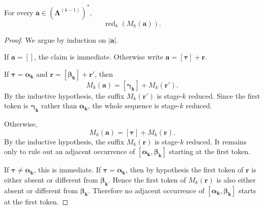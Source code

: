 \begin{lemma}
    \label{lemma:bpe-merge-produces-reduced}
    For every $\mathbf{a} \in (\boldsymbol{\Lambda}^{(k-1)})^*$,
    \[
    \operatorname{red}_k(M_k(\mathbf{a})).
    \]
\end{lemma}
\begin{proof}
    We argue by induction on $|\mathbf{a}|$.

    If $\mathbf{a} = []$, the claim is immediate.
    Otherwise write $\mathbf{a} = [\boldsymbol{\tau}] + \mathbf{r}$.

    If $\boldsymbol{\tau} = \boldsymbol{\alpha_k}$ and $\mathbf{r} = [\boldsymbol{\beta_k}] + \mathbf{r}'$,
    then
    \[
    M_k(\mathbf{a}) = [\boldsymbol{\gamma_k}] + M_k(\mathbf{r}').
    \]
    By the inductive hypothesis, the suffix $M_k(\mathbf{r}')$ is stage-$k$ reduced.
    Since the first token is $\boldsymbol{\gamma_k}$ rather than $\boldsymbol{\alpha_k}$,
    the whole sequence is stage-$k$ reduced.

    Otherwise,
    \[
    M_k(\mathbf{a}) = [\boldsymbol{\tau}] + M_k(\mathbf{r}).
    \]
    By the inductive hypothesis, the suffix $M_k(\mathbf{r})$ is stage-$k$ reduced.
    It remains only to rule out an adjacent occurrence of
    $[\boldsymbol{\alpha_k}, \boldsymbol{\beta_k}]$ starting at the first token.

    If $\boldsymbol{\tau} \neq \boldsymbol{\alpha_k}$, this is immediate.
    If $\boldsymbol{\tau} = \boldsymbol{\alpha_k}$, then by hypothesis the first token of $\mathbf{r}$
    is either absent or different from $\boldsymbol{\beta_k}$.
    Hence the first token of $M_k(\mathbf{r})$ is also either absent or different from $\boldsymbol{\beta_k}$.
    Therefore no adjacent occurrence of $[\boldsymbol{\alpha_k}, \boldsymbol{\beta_k}]$
    starts at the first token.
\end{proof}


